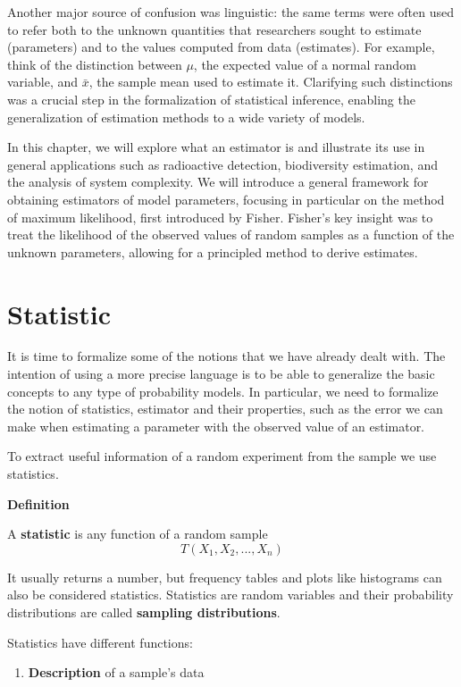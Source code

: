 \documentclass[
]{book}
\providecommand{\tightlist}{%
  \setlength{\itemsep}{0pt}\setlength{\parskip}{0pt}}
\begin{document}
Another major source of confusion was linguistic: the same terms were often used to refer both to the unknown quantities that researchers sought to estimate (parameters) and to the values computed from data (estimates). For example, think of the distinction between \(\mu\), the expected value of a normal random variable, and \(\bar{x}\), the sample mean used to estimate it. Clarifying such distinctions was a crucial step in the formalization of statistical inference, enabling the generalization of estimation methods to a wide variety of models.

In this chapter, we will explore what an estimator is and illustrate its use in general applications such as radioactive detection, biodiversity estimation, and the analysis of system complexity. We will introduce a general framework for obtaining estimators of model parameters, focusing in particular on the method of maximum likelihood, first introduced by Fisher. Fisher's key insight was to treat the likelihood of the observed values of random samples as a function of the unknown parameters, allowing for a principled method to derive estimates.

\hypertarget{statistic}{%
\section{Statistic}\label{statistic}}

It is time to formalize some of the notions that we have already dealt with. The intention of using a more precise language is to be able to generalize the basic concepts to any type of probability models. In particular, we need to formalize the notion of statistics, estimator and their properties, such as the error we can make when estimating a parameter with the observed value of an estimator.

To extract useful information of a random experiment from the sample we use statistics.

\textbf{Definition}

A \textbf{statistic} is any function of a random sample
\[T(X_1,X_2, ..., X_n)\]

It usually returns a number, but frequency tables and plots like histograms can also be considered statistics. Statistics are random variables and their probability distributions are called \textbf{sampling distributions}.

Statistics have different functions:

\begin{enumerate}
\def\labelenumi{\arabic{enumi}.}
\tightlist
\item
  \textbf{Description} of a sample's data
\end{enumerate}
\end{document}
